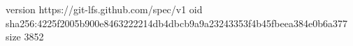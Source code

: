 version https://git-lfs.github.com/spec/v1
oid sha256:4225f2005b900e8463222214db4dbcb9a9a23243353f4b45fbeea384e0b6a377
size 3852
